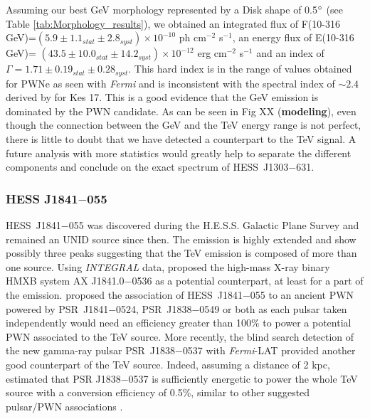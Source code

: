 Assuming our best GeV morphology represented by a Disk shape of 0.5$\mbox{$^\circ$}$ (see Table \ref{tab:Morphology_results}), we obtained an integrated flux of F(10-316 GeV)=$(5.9 \pm 1.1_{stat} \pm 2.8_{syst}) \times 10^{-10}$ ph cm$^{-2}$ s$^{-1}$, an energy flux of E(10-316 GeV)= $(43.5 \pm 10.0_{stat} \pm 14.2_{syst}) \times 10^{-12}$ erg cm$^{-2}$ s$^{-1}$ and an index of $\Gamma = 1.71 \pm 0.19_{stat} \pm 0.28_{syst}$. This hard index is in the range of values obtained for PWNe as seen with \emph{Fermi} and is inconsistent with the spectral index of $\sim 2.4$ derived by \cite{2011ApJ...740L..12W} for Kes 17. This is a good evidence that the GeV emission is dominated by the PWN candidate. As can be seen in Fig XX (\textbf{modeling}), even though the connection between the GeV and the TeV energy range is not perfect, there is little to doubt that we have detected a counterpart to the TeV signal. A future analysis with more statistics would greatly help to separate the different components and conclude on the exact spectrum of HESS~J1303$-$631.

\subsubsection*{HESS J1841$-$055}

HESS~J1841$-$055 was discovered during the H.E.S.S. Galactic Plane Survey \citep{2008AA...477..353A} and remained an UNID source since then. The emission is highly extended and show possibly three peaks suggesting that the TeV emission is composed of more than one source. Using \emph{INTEGRAL} data, \cite{2009ApJ...697.1194S} proposed the  high-mass X-ray binary HMXB system AX J1841.0$-$0536 as a potential counterpart, at least for a part of the emission. \cite{2011ICRC....6..197T} proposed the association of HESS~J1841$-$055 to an ancient PWN powered by PSR~J1841$-$0524, PSR~J1838$-$0549 or both as each pulsar taken independently would need an efficiency greater than 100\% to power a potential PWN associated to the TeV source. More recently, the blind search detection of the new gamma-ray pulsar PSR~J1838$-$0537 with \emph{Fermi}-LAT provided another good counterpart of the TeV source. Indeed, assuming a distance of 2 kpc, \cite{2012ApJ...755L..20P} estimated that PSR J1838$-$0537 is sufficiently energetic to power the whole TeV source with a conversion efficiency of 0.5\%, similar to other suggested pulsar/PWN associations \citep{2008ApJ...682L..41H}.

